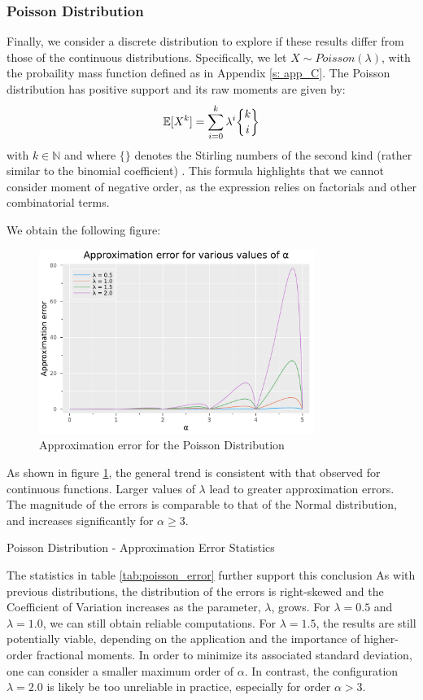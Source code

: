 \subsubsection{Poisson Distribution}
Finally, we consider a discrete distribution to explore if these results differ from those of the continuous distributions. Specifically, we let \(X \sim Poisson(\lambda)\), with the probaility mass function defined as in Appendix \ref{s: app_C}. The Poisson distribution has positive support and its raw moments are given by: \[\mathbb{E}[X^k] = \sum_{i = 0}^{k} \lambda^i \stirlingii{k}{i}\] with \(k \in \mathbb{N}\) and where \(\{\}\) denotes the Stirling numbers of the second kind (rather similar to the binomial coefficient) \cite{haight1967}. This formula highlights that we cannot consider moment of negative order, as the expression relies on factorials and other combinatorial terms.

We obtain the following figure:
\begin{figure}[H]
    \centering
    \includegraphics[width=0.8\textwidth]{figures/error_plot_poisson.pdf}
    \caption{Approximation error for the Poisson Distribution}
    \label{fig:poisson_plot_error}
\end{figure}
As shown in figure \ref{fig:poisson_plot_error}, the general trend is consistent with that observed for continuous functions. Larger values of \(\lambda\) lead to greater approximation errors. The magnitude of the errors is comparable to that of the Normal distribution, and increases significantly for \(\alpha \geq 3\).


\begin{table}[H]
    \centering

\caption{Poisson Distribution - Approximation Error Statistics} 
\label{tab:poisson_error}
\end{table}
The statistics in table \ref{tab:poisson_error} further support this conclusion
As with previous distributions, the distribution of the errors is right-skewed and the Coefficient of Variation increases as the parameter, \(\lambda\), grows.
For \(\lambda = 0.5\) and \(\lambda = 1.0\), we can still obtain reliable computations. For \(\lambda = 1.5\), the results are still potentially viable, depending on the application and the importance of higher-order fractional moments. In order to minimize its associated standard deviation, one can consider a smaller maximum order of \(\alpha\). In contrast, the configuration \(\lambda = 2.0\) is likely be too unreliable in practice, especially for order \(\alpha > 3\).

